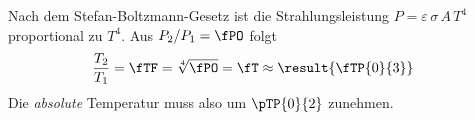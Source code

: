 Nach dem Stefan-Boltzmann-Gesetz ist die Strahlungsleistung $P = \varepsilon\,\sigma\,A\,T^4$ proportional zu $T^4$. Aus $P_2/P_1 = \fPO$ folgt
\begin{align}
 \frac{T_2}{T_1} &= \fTF = \sqrt[4]{\fPO} = \fT \approx \result{\fTP{0}{3}}
\end{align}
Die \emph{absolute} Temperatur muss also um $\pTP{0}{2}$ zunehmen.
